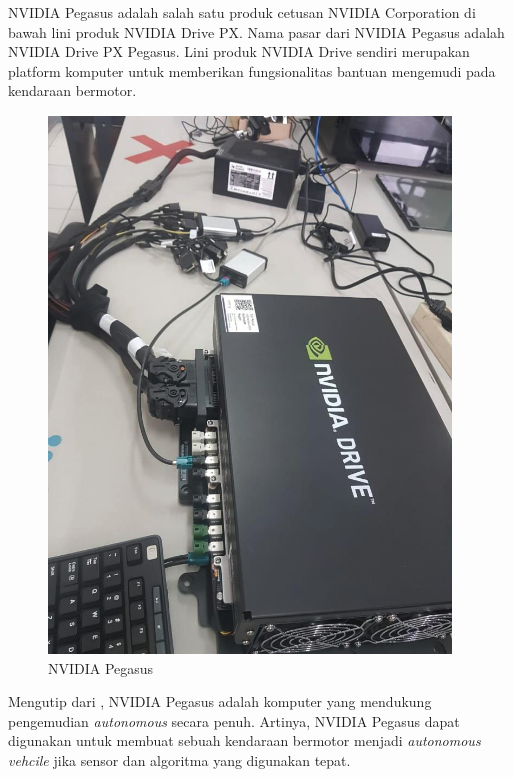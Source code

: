 NVIDIA Pegasus adalah salah satu produk cetusan NVIDIA Corporation di bawah lini
produk NVIDIA Drive PX. Nama pasar dari NVIDIA Pegasus adalah N\-VI\-DI\-A Drive
PX Pegasus. Lini produk NVIDIA Drive sendiri merupakan platform komputer untuk
memberikan fungsionalitas bantuan mengemudi pada kendaraan bermotor.

\begin{figure}
    \centering
    \includegraphics[width=\textwidth]{resources/chapter-2/pegasus.png}
    \caption{NVIDIA Pegasus \parencite{trilaksono_laporanRispro}}
\end{figure}

Mengutip dari \parencite{oh_2017}, NVIDIA Pegasus adalah komputer yang mendukung
pengemudian \textit{autonomous} secara penuh. Artinya, NVIDIA Pegasus dapat
digunakan untuk membuat sebuah kendaraan bermotor menjadi \textit{autonomous
    vehcile} jika sensor dan algoritma yang digunakan tepat.

